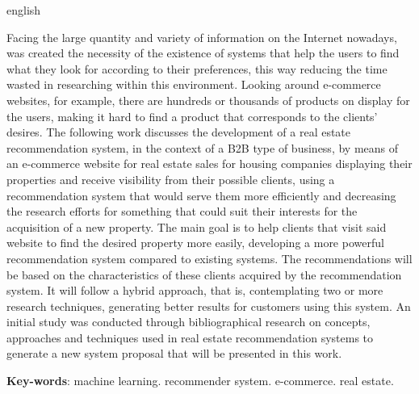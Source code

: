 \begin{resumo}[Abstract]
 \begin{otherlanguage*}{english}

Facing the large quantity and variety of information on the Internet nowadays, was created the necessity of the existence of systems that help the users to find what they look for according to their preferences, this way reducing the time wasted in researching within this environment. Looking around e-commerce websites, for example, there are hundreds or thousands of products on display for the users, making it hard to find a product that corresponds to the clients' desires. The following work discusses the development of a real estate recommendation system, in the context of a B2B type of business, by means of an e-commerce website for real estate sales for housing companies displaying their properties and receive visibility from their possible clients, using a recommendation system that would serve them more efficiently and decreasing the research efforts for something that could suit their interests for the acquisition of a new property. The main goal is to help clients that visit said website to find the desired property more easily, developing a more powerful recommendation system compared to existing systems. The recommendations will be based on the characteristics of these clients acquired by the recommendation system. It will follow a hybrid approach, that is, contemplating two or more research techniques, generating better results for customers using this system. An initial study was conducted through bibliographical research on concepts, approaches and techniques used in real estate recommendation systems to generate a new system proposal that will be presented in this work.

   \vspace{\onelineskip}
 
   \noindent 
   \textbf{Key-words}: machine learning. recommender system. e-commerce. real estate.
 \end{otherlanguage*}
\end{resumo}
